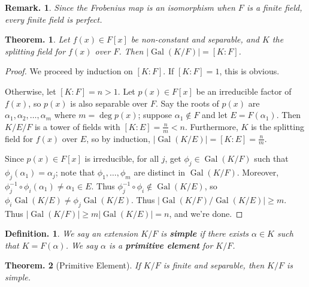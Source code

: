 \documentclass[11pt, a4paper]{memoir}
\newcommand{\mbf}[1]{{\boldmath\bfseries #1}}
\theoremstyle{change}
\newtheorem{theorem}{Theorem.}[section]
\theoremstyle{plain}
\theoremstyle{nonumberplain}
\newtheorem{definition}{Definition.}
\newtheorem{remark}{Remark.}
\newtheorem{proof}{Proof}
\DeclareMathOperator{\Gal}{Gal}
\numberwithin{equation}{section}
\begin{document}
\begin{remark}
    Since the Frobenius map is an isomorphism when $F$ is a finite field, every finite field is perfect.
\end{remark}
\begin{theorem}\label{thm:gal-size}
    Let $f(x)\in F[x]$ be non-constant and separable, and $K$ the splitting field for $f(x)$ over $F$.
    Then $|\Gal(K/F)|=[K:F]$.
\end{theorem}
\begin{proof}
    We proceed by induction on $[K:F]$.
    If $[K:F]=1$, this is obvious.

    Otherwise, let $[K:F]=n>1$.
    Let $p(x)\in F[x]$ be an irreducible factor of $f(x)$, so $p(x)$ is also separable over $F$.
    Say the roots of $p(x)$ are $\alpha_1,\alpha_2,\ldots,\alpha_m$ where $m=\deg p(x)$; suppose $\alpha_1\notin F$ and let $E=F(\alpha_1)$.
    Then $K/E/F$ is a tower of fields with $[K:E]=\frac{n}{m}<n$.
    Furthermore, $K$ is the splitting field for $f(x)$ over $E$, so by induction, $|\Gal(K/E)|=[K:E]=\frac{n}{m}$.

    Since $p(x)\in F[x]$ is irreducible, for all $j$, get $\phi_j\in\Gal(K/F)$ such that $\phi_j(\alpha_1)=\alpha_j$; note that $\phi_1,\ldots,\phi_m$ are distinct in $\Gal(K/F)$.
    Moreover, $\phi_j^{-1}\circ\phi_i(\alpha_1)\neq\alpha_1\in E$.
    Thus $\phi_j^{-1}\circ\phi_i\notin\Gal(K/E)$, so $\phi_i\Gal(K/E)\neq \phi_j\Gal(K/E)$.
    Thus $|\Gal(K/F)/\Gal(K/E)|\geq m$.
    Thus $|\Gal(K/F)|\geq m|\Gal(K/E)|=n$, and we're done.
\end{proof}
\begin{definition}
    We say an extension $K/F$ is \mbf{simple} if there exists $\alpha\in K$ such that $K=F(\alpha)$.
    We say $\alpha$ is a \mbf{primitive element} for $K/F$.
\end{definition}
\begin{theorem}[Primitive Element]\label{thm:prim-el}
    If $K/F$ is finite and separable, then $K/F$ is simple.
\end{theorem}
\end{document}
